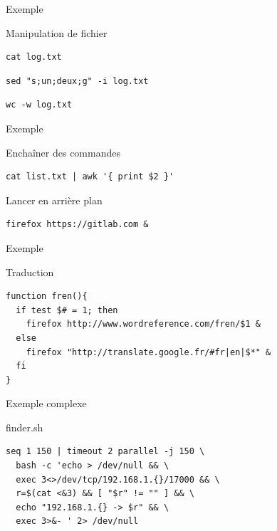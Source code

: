 \documentclass{beamer}
\begin{document}
\begin{frame}[fragile]{Exemple}
\begin{block}{Manipulation de fichier}
\begin{verbatim}
cat log.txt
\end{verbatim}
\begin{verbatim}
sed "s;un;deux;g" -i log.txt
\end{verbatim}
\begin{verbatim}
wc -w log.txt
\end{verbatim}
\end{block}
\end{frame}

\begin{frame}[fragile]{Exemple}
\begin{block}{Enchaîner des commandes}
\begin{verbatim}
cat list.txt | awk '{ print $2 }'
\end{verbatim}
\end{block}
\begin{block}{Lancer en arrière plan}
\begin{verbatim}
firefox https://gitlab.com &
\end{verbatim}
\end{block}
\end{frame}

\begin{frame}[fragile]{Exemple}
\begin{block}{Traduction}
\begin{verbatim}
function fren(){
  if test $# = 1; then
    firefox http://www.wordreference.com/fren/$1 &
  else
    firefox "http://translate.google.fr/#fr|en|$*" &
  fi
}
\end{verbatim}
\end{block}
\end{frame}

\begin{frame}[fragile]{Exemple complexe}
\begin{block}{finder.sh}
\begin{verbatim}
seq 1 150 | timeout 2 parallel -j 150 \
  bash -c 'echo > /dev/null && \
  exec 3<>/dev/tcp/192.168.1.{}/17000 && \
  r=$(cat <&3) && [ "$r" != "" ] && \
  echo "192.168.1.{} -> $r" && \
  exec 3>&- ' 2> /dev/null
\end{verbatim}
\end{block}
\end{frame}


\end{document}
